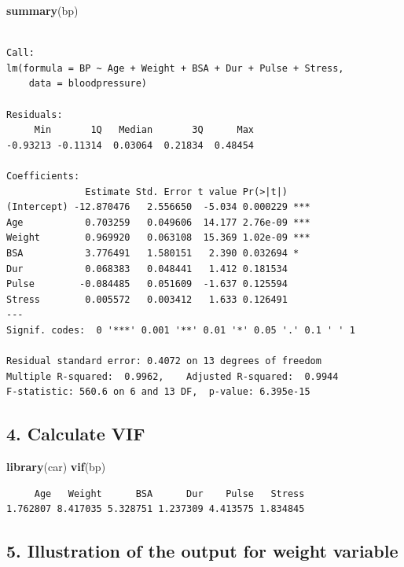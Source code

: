 \documentclass[]{article}
\newenvironment{Shaded}{\begin{snugshade}}{\end{snugshade}}
\newcommand{\KeywordTok}[1]{\textcolor[rgb]{0.13,0.29,0.53}{\textbf{#1}}}
\newcommand{\NormalTok}[1]{#1}
\begin{document}
\begin{Shaded}
\begin{Highlighting}[]
\KeywordTok{summary}\NormalTok{(bp)}
\end{Highlighting}
\end{Shaded}

\begin{verbatim}

Call:
lm(formula = BP ~ Age + Weight + BSA + Dur + Pulse + Stress, 
    data = bloodpressure)

Residuals:
     Min       1Q   Median       3Q      Max 
-0.93213 -0.11314  0.03064  0.21834  0.48454 

Coefficients:
              Estimate Std. Error t value Pr(>|t|)    
(Intercept) -12.870476   2.556650  -5.034 0.000229 ***
Age           0.703259   0.049606  14.177 2.76e-09 ***
Weight        0.969920   0.063108  15.369 1.02e-09 ***
BSA           3.776491   1.580151   2.390 0.032694 *  
Dur           0.068383   0.048441   1.412 0.181534    
Pulse        -0.084485   0.051609  -1.637 0.125594    
Stress        0.005572   0.003412   1.633 0.126491    
---
Signif. codes:  0 '***' 0.001 '**' 0.01 '*' 0.05 '.' 0.1 ' ' 1

Residual standard error: 0.4072 on 13 degrees of freedom
Multiple R-squared:  0.9962,    Adjusted R-squared:  0.9944 
F-statistic: 560.6 on 6 and 13 DF,  p-value: 6.395e-15
\end{verbatim}

\hypertarget{calculate-vif}{%
\subsection{4. Calculate VIF}\label{calculate-vif}}

\begin{Shaded}
\begin{Highlighting}[]
\KeywordTok{library}\NormalTok{(car)}
\KeywordTok{vif}\NormalTok{(bp)}
\end{Highlighting}
\end{Shaded}

\begin{verbatim}
     Age   Weight      BSA      Dur    Pulse   Stress 
1.762807 8.417035 5.328751 1.237309 4.413575 1.834845 
\end{verbatim}

\hypertarget{illustration-of-the-output-for-weight-variable}{%
\subsection{5. Illustration of the output for weight
variable}\label{illustration-of-the-output-for-weight-variable}}
\end{document}
